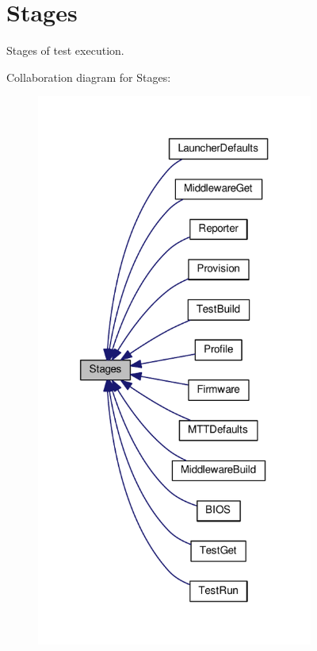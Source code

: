 \hypertarget{group___stages}{\section{Stages}
\label{group___stages}
}


Stages of test execution.  


Collaboration diagram for Stages\-:
\nopagebreak
\begin{figure}[H]
\begin{center}
\leavevmode
\includegraphics[width=258pt]{group___stages}
\end{center}
\end{figure}
